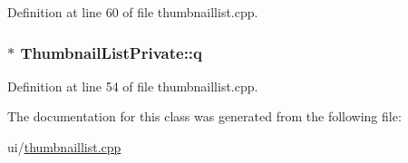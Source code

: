 Definition at line 60 of file thumbnaillist.\+cpp.

\hypertarget{classThumbnailListPrivate_ae2177fa339c619c575aa337d41465a4f}{
\subsubsection[{q}]{$\ast$ Thumbnail\+List\+Private\+::q}}\label{classThumbnailListPrivate_ae2177fa339c619c575aa337d41465a4f}


Definition at line 54 of file thumbnaillist.\+cpp.



The documentation for this class was generated from the following file\+:\begin{DoxyCompactItemize}
\item 
ui/\hyperlink{thumbnaillist_8cpp}{thumbnaillist.\+cpp}\end{DoxyCompactItemize}
